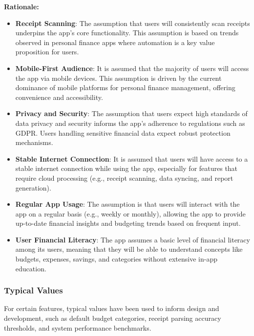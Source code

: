 \documentclass[12pt]{article}
\begin{document}
\noindent\textbf{Rationale:}
\begin{itemize}
    \item \textbf{Receipt Scanning}: The assumption that users will consistently scan receipts underpins the app’s core functionality. This assumption is based on trends observed in personal finance apps where automation is a key value proposition for users.
    \item \textbf{Mobile-First Audience}: It is assumed that the majority of users will access the app via mobile devices. This assumption is driven by the current dominance of mobile platforms for personal finance management, offering convenience and accessibility.
    \item \textbf{Privacy and Security}: The assumption that users expect high standards of data privacy and security informs the app’s adherence to regulations such as GDPR. Users handling sensitive financial data expect robust protection mechanisms.
    \item \textbf{Stable Internet Connection}: It is assumed that users will have access to a stable internet connection while using the app, especially for features that require cloud processing (e.g., receipt scanning, data syncing, and report generation).
    \item \textbf{Regular App Usage}: The assumption is that users will interact with the app on a regular basis (e.g., weekly or monthly), allowing the app to provide up-to-date financial insights and budgeting trends based on frequent input.
    \item \textbf{User Financial Literacy}: The app assumes a basic level of financial literacy among its users, meaning that they will be able to understand concepts like budgets, expenses, savings, and categories without extensive in-app education.
\end{itemize}

\subsubsection{Typical Values}
For certain features, typical values have been used to inform design and development, such as default budget categories, receipt parsing accuracy thresholds, and system performance benchmarks.\\
\end{document}
